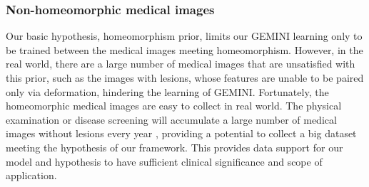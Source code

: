 \subsubsection{Non-homeomorphic medical images}\label{sec:non}
Our basic hypothesis, homeomorphism prior, limits our GEMINI learning only to be trained between the medical images meeting homeomorphism. However, in the real world, there are a large number of medical images that are unsatisfied with this prior, such as the images with lesions, whose features are unable to be paired only via deformation, hindering the learning of GEMINI. Fortunately, the homeomorphic medical images are easy to collect in real world. The physical examination or disease screening will accumulate a large number of medical images without lesions every year \cite{luo2016big}, providing a potential to collect a big dataset meeting the hypothesis of our framework. This provides data support for our model and hypothesis to have sufficient clinical significance and scope of application.

